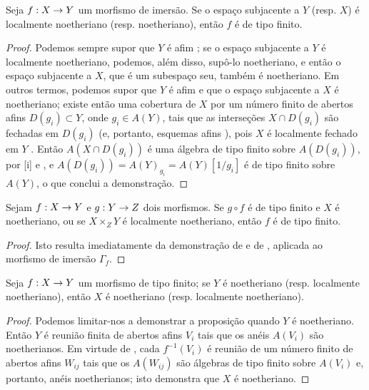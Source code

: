\documentclass[oneside]{amsart}
\makeatletter
\newcommand{\ega@arrow}[2]{\mathchoice{#1}{#2}{#2}{#2}}
\renewcommand{\to}{\ega@arrow{\longrightarrow}{\rightarrow}}
\let\EGAOriginalLabel\label
\renewcommand{\label}[1]{\phantomsection\EGAOriginalLabel{#1}}
\makeatother
\begin{document}
\begin{corollary}[6.3.5]
\label{I.6.3.5}
Seja $f:X\to Y$ um morfismo de imersão.
Se o espaço subjacente a $Y$ (resp. $X$) é localmente noetheriano (resp.
noetheriano), então $f$ é de tipo finito.
\end{corollary}

\begin{proof}
Podemos sempre supor que $Y$ é afim ;
se o espaço subjacente a $Y$ é localmente noetheriano, podemos, além disso,
supô-lo noetheriano, e então o espaço subjacente a $X$, que é um subespaço
seu, também é noetheriano.
Em outros termos, podemos supor que $Y$ é afim e que o espaço subjacente a
$X$ é noetheriano;
existe então uma cobertura de $X$ por um número finito de abertos afins
$D(g_i)\subset Y$, onde $g_i\in A(Y)$, tais que as interseções
$X\cap D(g_i)$ são fechadas em $D(g_i)$ (e, portanto, esquemas afins
), pois $X$ é localmente fechado em $Y$ .
Então $A(X\cap D(g_i))$ é uma álgebra de tipo finito sobre $A(D(g_i))$, por
[i] e , e
$A(D(g_i))=A(Y)_{g_i}=A(Y)[1/g_i]$ é de tipo finito sobre $A(Y)$, o que
conclui a demonstração.
\end{proof}

\begin{corollary}[6.3.6]
\label{I.6.3.6}
Sejam $f:X\to Y$ e $g:Y\to Z$ dois morfismos.
Se $g\circ f$ é de tipo finito e $X$ é noetheriano, ou se
$X\times_Z Y$ é localmente noetheriano, então $f$ é de tipo finito.
\end{corollary}

\begin{proof}
Isto resulta imediatamente da demonstração de  e de
, aplicada ao morfismo de imersão $\Gamma_f$.
\end{proof}

\begin{proposition}[6.3.7]
\label{I.6.3.7}
Seja $f:X\to Y$ um morfismo de tipo finito;
se $Y$ é noetheriano (resp. localmente noetheriano), então $X$ é
noetheriano (resp. localmente noetheriano).
\end{proposition}

\begin{proof}
Podemos limitar-nos a demonstrar a proposição quando $Y$ é noetheriano.
Então $Y$ é reunião finita de abertos afins $V_i$ tais que os anéis
$A(V_i)$ são noetherianos.
Em virtude de , cada $f^{-1}(V_i)$ é reunião de um número
finito de abertos afins $W_{ij}$ tais que os $A(W_{ij})$ são álgebras de
tipo finito sobre $A(V_i)$ e, portanto, anéis noetherianos;
isto demonstra que $X$ é noetheriano.
\end{proof}
\end{document}
